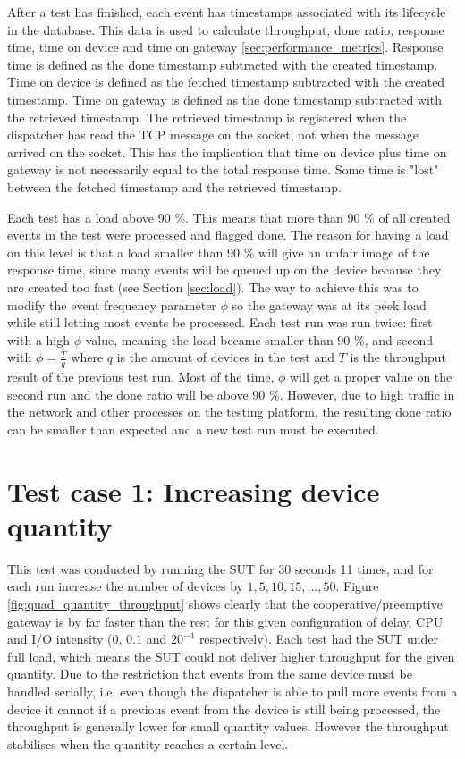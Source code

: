 After a test has finished, each event has timestamps associated with its
lifecycle in the database. This data is used to calculate throughput, done
ratio, response time, time on device and time on gateway
\ref{sec:performance_metrics}. Response time is defined as the done timestamp
subtracted with the created timestamp. Time on device is defined as the fetched
timestamp subtracted with the created timestamp. Time on gateway is defined as
the done timestamp subtracted with the retrieved timestamp. The retrieved
timestamp is registered when the dispatcher has read the TCP message on the
socket, not when the message arrived on the socket. This has the implication
that time on device plus time on gateway is not necessarily equal to the total
response time. Some time is "lost" between the fetched timestamp and the
retrieved timestamp.

Each test has a load above 90 \%. This means that more than 90 \% of all
created events in the test were processed and flagged done. The reason for
having a load on this level is that a load smaller than 90 \% will give an
unfair image of the response time, since many events will be queued up on the
device because they are created too fast (see Section \ref{sec:load}). The way
to achieve this was to modify the event frequency parameter $\phi$ so the
gateway was at its peek load while still letting most events be processed. Each
test run was run twice: first with a high $\phi$ value, meaning the load became
smaller than 90 \%, and second with $\phi = \frac{T}{q}$ where $q$ is the
amount of devices in the test and $T$ is the throughput result of the previous
test run. Most of the time, $\phi$ will get a proper value on the second run
and the done ratio will be above 90 \%. However, due to high traffic in the
network and other processes on the testing platform, the resulting done ratio
can be smaller than expected and a new test run must be executed.

\section{Test case 1: Increasing device quantity}

This test was conducted by running the SUT for 30 seconds 11 times, and for
each run increase the number of devices by $1, 5, 10, 15, ..., 50$. Figure
\ref{fig:quad_quantity_throughput} shows clearly that the
cooperative/preemptive gateway is by far faster than the rest for this given
configuration of delay, CPU and I/O intensity (0, $0.1$ and $20^{-4}$
respectively). Each test had the SUT under full load, which means the SUT could
not deliver higher throughput for the given quantity. Due to the restriction
that events from the same device must be handled serially, i.e. even though the
dispatcher is able to pull more events from a device it cannot if a previous
event from the device is still being processed, the throughput is generally
lower for small quantity values. However the throughput stabilises when the
quantity reaches a certain level.

